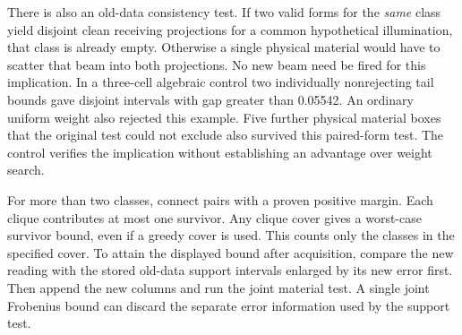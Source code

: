 There is also an old-data consistency test. If two valid forms for the \emph{same} class yield disjoint clean receiving projections for a common hypothetical illumination, that class is already empty. Otherwise a single physical material would have to scatter that beam into both projections. No new beam need be fired for this implication. In a three-cell algebraic control two individually nonrejecting tail bounds gave disjoint intervals with gap greater than 0.05542. An ordinary uniform weight also rejected this example. Five further physical material boxes that the original test could not exclude also survived this paired-form test. The control verifies the implication without establishing an advantage over weight search.

For more than two classes, connect pairs with a proven positive margin. Each clique contributes at most one survivor. Any clique cover gives a worst-case survivor bound, even if a greedy cover is used. This counts only the classes in the specified cover. To attain the displayed bound after acquisition, compare the new reading with the stored old-data support intervals enlarged by its new error first. Then append the new columns and run the joint material test. A single joint Frobenius bound can discard the separate error information used by the support test.
